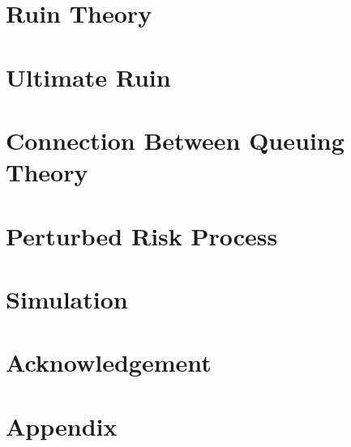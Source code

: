 \documentclass[a4paper, 12pt]{article} %
\begin{document}
\tableofcontents
\setcounter{tocdepth}{1}

\section{Ruin Theory}


\section{Ultimate Ruin}



\section{Connection Between Queuing Theory}

\section{Perturbed Risk Process }

\section{Simulation}


\section{Acknowledgement}

\section{Appendix}

\end{document}
